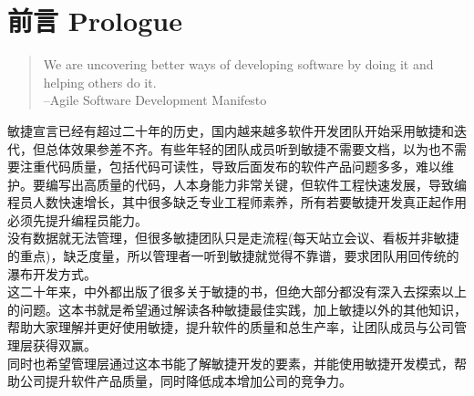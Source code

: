 \chapter*{前言 Prologue} %

\begin{quote}
We are uncovering better ways of developing software by doing it and helping others do it.\\
--Agile Software Development Manifesto
\end{quote}

敏捷宣言已经有超过二十年的历史，国内越来越多软件开发团队开始采用敏捷和迭代，但总体效果参差不齐。有些年轻的团队成员听到敏捷不需要文档，以为也不需要注重代码质量，包括代码可读性，导致后面发布的软件产品问题多多，难以维护。要编写出高质量的代码，人本身能力非常关键，但软件工程快速发展，导致编程员人数快速增长，其中很多缺乏专业工程师素养，所有若要敏捷开发真正起作用必须先提升编程员能力。\\
没有数据就无法管理，但很多敏捷团队只是走流程(每天站立会议、看板并非敏捷的重点)，缺乏度量，所以管理者一听到敏捷就觉得不靠谱，要求团队用回传统的瀑布开发方式。\\
这二十年来，中外都出版了很多关于敏捷的书，但绝大部分都没有深入去探索以上的问题。这本书就是希望通过解读各种敏捷最佳实践，加上敏捷以外的其他知识，帮助大家理解并更好使用敏捷，提升软件的质量和总生产率，让团队成员与公司管理层获得双赢。\\
同时也希望管理层通过这本书能了解敏捷开发的要素，并能使用敏捷开发模式，帮助公司提升软件产品质量，同时降低成本增加公司的竞争力。\\


